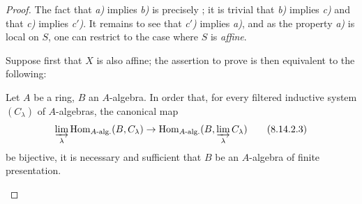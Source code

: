 \begin{proof}
The fact that \emph{a)} implies \emph{b)} is precisely ; it is trivial that \emph{b)} implies \emph{c)} and that \emph{c)} implies \emph{c$'$)}.
It remains to see that \emph{c$'$)} implies \emph{a)}, and as the property \emph{a)} is local on $S$, one can restrict to the case where $S$ is \emph{affine}.

Suppose first that $X$ is also affine; the assertion to prove is then equivalent to the following:

\begin{corollary}[8.14.2.2]
\label{IV.8.14.2.2}
Let $A$ be a ring, $B$ an $A$-algebra.
In order that, for every filtered inductive system $(C_\lambda)$ of $A$-algebras, the canonical map
\begin{equation}
\label{IV.8.14.2.3}
\varinjlim_\lambda\operatorname{Hom}_{A\text{-}\mathrm{alg.}}(B,C_\lambda)\to\operatorname{Hom}_{A\text{-}\mathrm{alg.}}(B,\varinjlim_\lambda C_\lambda) \tag{8.14.2.3}
\end{equation}
be bijective, it is necessary and sufficient that $B$ be an $A$-algebra of finite presentation.
\end{corollary}


\end{proof}
